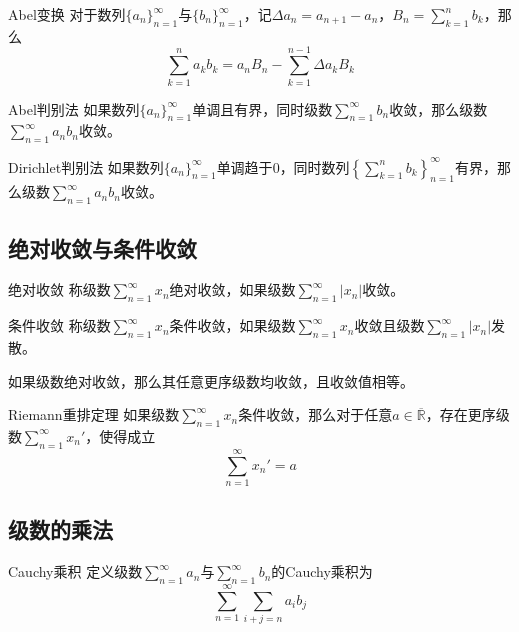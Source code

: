 \documentclass[lang = cn, scheme = chinese, thmcnt = section]{elegantbook}
\newcommand{\R}{\mathbb{R}}            %
\newcommand{\dis}{\displaystyle}
\begin{document}
\begin{theorem}{Abel变换}
	对于数列$\{a_n\}_{n=1}^{\infty}$与$\{b_n\}_{n=1}^{\infty}$，记$\Delta a_n=a_{n+1}-a_n$，$\dis B_n=\sum_{k=1}^{n}b_k$，那么
	$$
	\sum_{k=1}^{n}a_kb_k
	=a_nB_n-\sum_{k=1}^{n-1}\Delta a_k B_k
	$$
\end{theorem}

\begin{theorem}{Abel判别法}
	如果数列$\{a_n\}_{n=1}^{\infty}$单调且有界，同时级数$\dis\sum_{n=1}^{\infty}b_n$收敛，那么级数$\dis\sum_{n=1}^{\infty}a_nb_n$收敛。
\end{theorem}

\begin{theorem}{Dirichlet判别法}
	如果数列$\{a_n\}_{n=1}^{\infty}$单调趋于$0$，同时数列$\dis\left\{\sum_{k=1}^{n}b_k\right\}_{n=1}^{\infty}$有界，那么级数$\dis\sum_{n=1}^{\infty}a_nb_n$收敛。
\end{theorem}

\subsection{绝对收敛与条件收敛}

\begin{definition}{绝对收敛}
	称级数$\dis \sum_{n=1}^{\infty}x_n$绝对收敛，如果级数$\dis \sum_{n=1}^{\infty}|x_n|$收敛。
\end{definition}

\begin{definition}{条件收敛}
	称级数$\dis \sum_{n=1}^{\infty}x_n$条件收敛，如果级数$\dis \sum_{n=1}^{\infty}x_n$收敛且级数$\dis \sum_{n=1}^{\infty}|x_n|$发散。
\end{definition}

\begin{theorem}
	如果级数绝对收敛，那么其任意更序级数均收敛，且收敛值相等。
\end{theorem}

\begin{theorem}{Riemann重排定理}
	如果级数$\dis \sum_{n=1}^{\infty}x_n$条件收敛，那么对于任意$a\in\overline{\R}$，存在更序级数$\dis \sum_{n=1}^{\infty}x_n'$，使得成立
	$$
	\sum_{n=1}^{\infty}x_n'=a
	$$
\end{theorem}

\subsection{级数的乘法}

\begin{definition}{Cauchy乘积}
	定义级数$\dis \sum_{n=1}^{\infty}a_n$与$\dis \sum_{n=1}^{\infty}b_n$的Cauchy乘积为
	$$
	\sum_{n=1}^{\infty}\sum_{i+j=n}a_ib_j
	$$
\end{definition}
\end{document}
